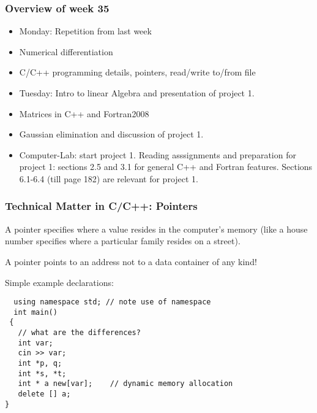 \documentclass{beamer}
\newenvironment{block_mdfboxadmon}[1][]{\begin{block}{#1}}{\end{block}}
\begin{document}
\begin{frame}
\frametitle{Overview of week 35}

\begin{block_mdfboxadmon}[]
\begin{itemize}
  \item Monday: Repetition from last week

  \item Numerical differentiation

  \item C/C++ programming details, pointers, read/write to/from file

  \item Tuesday: Intro to linear Algebra and presentation of project 1.

  \item Matrices in C++ and Fortran2008

  \item Gaussian elimination and discussion of project 1.

  \item Computer-Lab: start project 1. Reading asssignments and preparation for project 1: sections 2.5 and 3.1 for general C++ and Fortran features. Sections 6.1-6.4 (till page 182) are relevant for project 1.
\end{itemize}

\noindent
\end{block_mdfboxadmon}
\end{frame}

\begin{frame}
\frametitle{Technical Matter in C/C++: Pointers}

\begin{block_mdfboxadmon}[]
A pointer specifies where a value resides in the computer's memory (like a house number specifies where a particular family resides on a street).

A pointer points to an address not to a data container of any kind!

Simple example declarations:

\begin{verbatim}
  using namespace std; // note use of namespace
  int main()
 {
   // what are the differences?
   int var;
   cin >> var;
   int *p, q;
   int *s, *t;
   int * a new[var];    // dynamic memory allocation
   delete [] a;
}
\end{verbatim}
\end{block_mdfboxadmon}
\end{frame}
\end{document}
